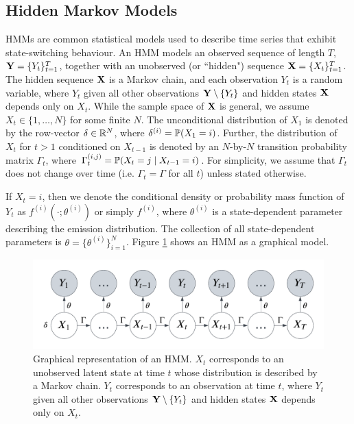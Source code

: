 \subsection{Hidden Markov Models}

HMMs are common statistical models used to describe time series that exhibit state-switching behaviour. An HMM models an observed sequence of length $T$, $\mathbf{Y} = \{Y_t\}_{t=1}^T$, together with an unobserved (or  ``hidden") sequence $\mathbf{X} = \{X_t\}_{t=1}^T$. The hidden sequence $\mathbf{X}$ is a Markov chain, and each observation $Y_t$ is a random variable, where $Y_t$ given all other observations $\mathbf{Y} \setminus \{Y_t\}$ and hidden states $\mathbf{X}$ depends only on $X_t$. While the sample space of $\mathbf{X}$ is general, we assume $X_t \in \{1,\ldots,N\}$ for some finite $N$. The unconditional distribution of $X_1$ is denoted by the row-vector $\delta \in \mathbb{R}^N$, where $\delta^{(i)} = \mathbb{P}(X_1 = i)$. Further, the distribution of $X_t$ for $t > 1$ conditioned on $X_{t-1}$ is denoted by an $N$-by-$N$ transition probability matrix $\Gamma_t$, where $\Gamma_t^{(i,j)} = \mathbb{P}(X_t = j \mid X_{t-1} = i)$. %
For simplicity, we assume that $\Gamma_t$ does not change over time (i.e. $\Gamma_t = \Gamma$ for all $t$) unless stated otherwise. 

If $X_t=i$, then we denote the conditional density or probability mass function of $Y_t$ as $f^{(i)}(\cdot ; \theta^{(i)})$ or simply $f^{(i)}$, where $\theta^{(i)}$ is a state-dependent parameter describing the emission distribution. The collection of all state-dependent parameters is $\theta = \{\theta^{(i)}\}_{i=1}^N$. Figure \ref{fig:HMM} shows an HMM as a graphical model.

\begin{figure}[h]
    \centering
    \includegraphics[width=5in]{../plt/HMM.png}
    \caption{Graphical representation of an HMM. $X_t$ corresponds to an unobserved latent state at time $t$ whose distribution is described by a Markov chain. $Y_t$ corresponds to an observation at time $t$, where $Y_t$ given all other observations $\mathbf{Y} \setminus \{Y_t\}$ and hidden states $\mathbf{X}$ depends only on $X_t$.}
    \label{fig:HMM}
\end{figure}

